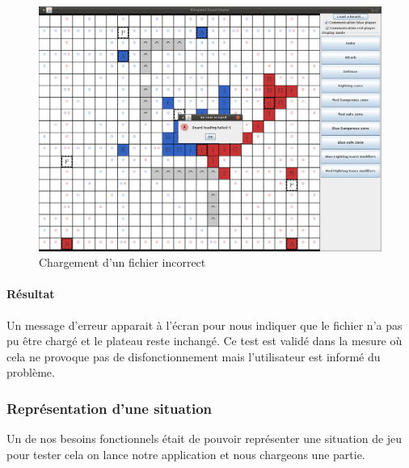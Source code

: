 				\begin{figure}[!h]
				    \caption{Chargement d'un fichier incorrect}
				    \centering
				    \centerline{\includegraphics[scale=0.35]{images/tests_fonctionnels/incorrect_file.png}}
				\end{figure}

				\paragraph{Résultat\\}
					Un message d'erreur apparait à l'écran pour nous indiquer que le fichier n'a pas pu être chargé et le plateau reste inchangé.
					Ce test est validé dans la mesure où cela ne provoque pas de disfonctionnement mais l'utilisateur est informé du problème.

			\subsubsection{Représentation d'une situation}
				Un de nos besoins fonctionnels était de pouvoir représenter une situation de jeu pour tester cela on lance notre application et nous chargeons une partie.

